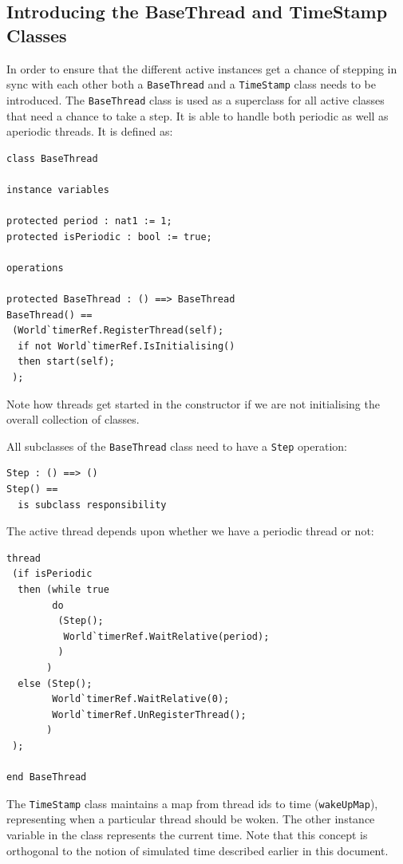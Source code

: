 \documentclass{overturerepchap}
\begin{document}
\subsection{Introducing the BaseThread and TimeStamp Classes}

In order to ensure that the different active instances get a chance of
stepping in sync with each other both a \texttt{BaseThread} and a
\texttt{TimeStamp} class needs to be introduced. The \texttt{BaseThread}
class is used as a superclass for all active classes that need a chance to 
take a step. It is able to handle both periodic as well as aperiodic threads.
It is defined as:

\begin{lstlisting}
class BaseThread
	
instance variables

protected period : nat1 := 1;
protected isPeriodic : bool := true;

operations

protected BaseThread : () ==> BaseThread
BaseThread() ==
 (World`timerRef.RegisterThread(self);
  if not World`timerRef.IsInitialising()
  then start(self);  
 );
\end{lstlisting}
\noindent Note how threads get started in the constructor if we are not
initialising the overall collection of classes.

All subclasses of the \texttt{BaseThread} class need to have a \texttt{Step}
operation:

\begin{lstlisting}
Step : () ==> ()
Step() ==
  is subclass responsibility
\end{lstlisting}

The active thread depends upon whether we have a periodic thread or not:

\begin{lstlisting}
thread
 (if isPeriodic
  then (while true
        do 
         (Step();
          World`timerRef.WaitRelative(period);
         )
       )
  else (Step();
        World`timerRef.WaitRelative(0);
        World`timerRef.UnRegisterThread();
       )
 );

end BaseThread
\end{lstlisting}

The \texttt{TimeStamp} class maintains a map from thread ids to 
time (\texttt{wakeUpMap}), representing when a particular thread 
should be woken. The other instance variable in the class
represents the current time. Note that this concept is orthogonal to
the notion of simulated time described earlier in this document.
\end{document}
